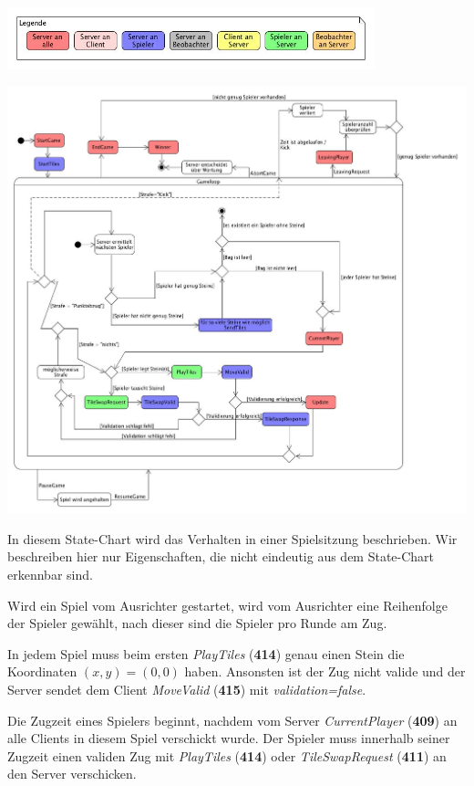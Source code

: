 \documentclass[a4paper, 10pt]{article}
\begin{document}
\newpage
\includegraphics[width=0.8\textwidth]{media/Legend}\par
\includegraphics[width=\textwidth]{media/StateMachineGame}\par
In diesem State-Chart wird das Verhalten in einer Spielsitzung beschrieben. Wir beschreiben hier nur Eigenschaften, die nicht eindeutig aus dem State-Chart erkennbar sind.\par
Wird ein Spiel vom Ausrichter gestartet, wird vom Ausrichter eine Reihenfolge der Spieler gewählt, nach dieser sind die Spieler pro Runde am Zug.\par
In jedem Spiel muss beim ersten \textit{PlayTiles} (\textbf{414}) genau einen Stein die Koordinaten $(x, y)=(0, 0)$ haben. Ansonsten ist der Zug nicht valide und der Server sendet dem Client  \textit{MoveValid} (\textbf{415}) mit \textit{validation=false}.\par
Die Zugzeit eines Spielers beginnt, nachdem vom Server \textit{CurrentPlayer} (\textbf{409}) an alle Clients in diesem Spiel verschickt wurde. Der Spieler muss innerhalb seiner Zugzeit einen validen Zug mit \textit{PlayTiles} (\textbf{414}) oder \textit{TileSwapRequest} (\textbf{411}) an den Server verschicken.\par
\end{document}
